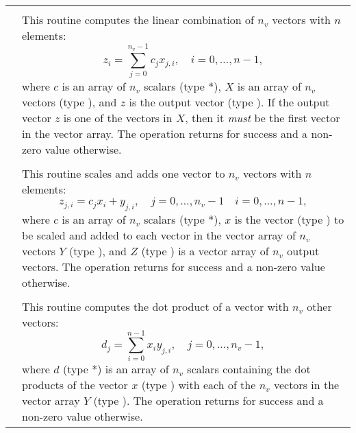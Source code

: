 \begin{xtabular}{|p{\coloneb}|p{\coltwob}|}
 &  \\
& This routine computes the linear combination of $n_v$ vectors with $n$
elements:
\begin{equation*}
z_i = \sum_{j=0}^{n_v-1} c_j x_{j,i}, \quad i=0,\ldots,n-1,
\end{equation*}
where $c$ is an array of $n_v$ scalars (type *), $X$ is an array of
$n_v$ vectors (type ), and $z$ is the output vector (type
). If the output vector $z$ is one of the vectors in $X$, then it
\textit{must} be the first vector in the vector array. The operation returns
 for success and a non-zero value otherwise.
\\[2mm]
 &  \\
& This routine scales and adds one vector to $n_v$ vectors with $n$ elements:
\begin{equation*}
z_{j,i} = c_j x_i + y_{j,i}, \quad j=0,\ldots,n_v-1 \quad i=0,\ldots,n-1,
\end{equation*}
where $c$ is an array of $n_v$ scalars (type *), $x$ is the vector
(type ) to be scaled and added to each vector in the vector array
of $n_v$ vectors $Y$ (type ), and $Z$ (type ) is a
vector array of $n_v$ output vectors. The operation returns  for success and a
non-zero value otherwise.
\\[2mm]
 &  \\
& This routine computes the dot product of a vector with $n_v$ other vectors:
\begin{equation*}
d_j = \sum_{i=0}^{n-1} x_i y_{j,i}, \quad j=0,\ldots,n_v-1,
\end{equation*}
where $d$ (type *) is an array of $n_v$ scalars containing the
dot products of the vector $x$ (type ) with each of the $n_v$
vectors in the vector array $Y$ (type ). The operation returns
 for success and a non-zero value otherwise.
\\
\end{xtabular}
\bigskip



